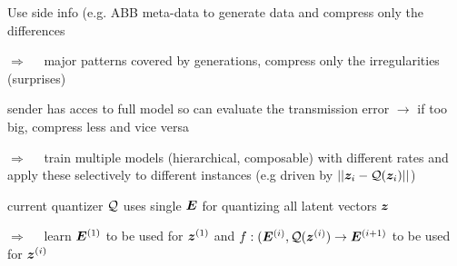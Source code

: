 \documentclass[smaller]{beamer}
\begin{document}
\begin{frame}[t]


\vskip 0.5cm

\emph{}
\vskip 0.1cm

{\scriptsize
Use side info (e.g. ABB meta-data to generate data and compress only the differences

\alert{$\Rightarrow \quad$ major patterns covered by generations, compress only the irregularities (surprises)}
}
\vskip 0.3cm

\emph{}
\vskip 0.1cm

{\scriptsize
sender has acces to full model so can evaluate the transmission error $\rightarrow$ if too big, compress less and vice versa

\alert{$\Rightarrow \quad$ train multiple models (hierarchical, composable) with different rates and apply these selectively to different instances (e.g driven by $||{\bm{z}}_i - {\mathcal{Q}}({\bm{z}}_i)||$)}
}
\vskip 0.3cm

\emph{}
\vskip 0.1cm

{\scriptsize
current quantizer ${\mathcal{Q}}$ uses single ${\bm{E}}$ for quantizing all latent vectors ${\bm{z}}$

\alert{$\Rightarrow \quad$ learn ${\bm{E}}^{(1)}$ to be used for ${\bm{z}}^{(1)}$ and $f : ({\bm{E}}^{(i)}, {\mathcal{Q}}({\bm{z}}^{(i)}) \to {\bm{E}}^{(i+1)}$ to be used for ${\bm{z}}^{(i)}$}
}

\end{frame}


\end{document}
